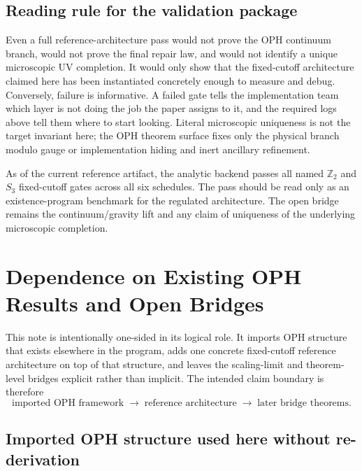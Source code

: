 \documentclass[11pt]{article}
\begin{document}
\subsection{Reading rule for the validation package}

Even a full reference-architecture pass would not prove the OPH continuum branch, would
not prove the final repair law, and would not identify a unique microscopic UV completion. It would only
show that the fixed-cutoff architecture claimed here has been instantiated concretely
enough to measure and debug. Conversely, failure is informative. A failed gate tells the
implementation team which layer is not doing the job the paper assigns to it, and the required
logs above tell them where to start looking. Literal microscopic uniqueness is not the target
invariant here; the OPH theorem surface fixes only the physical branch modulo gauge or
implementation hiding and inert ancillary refinement.

As of the current reference artifact, the analytic backend passes all named $\mathbb Z_2$ and $S_3$
fixed-cutoff gates across all six schedules. The pass should be read only as an existence-program
benchmark for the regulated architecture. The open bridge remains the continuum/gravity lift and
any claim of uniqueness of the underlying microscopic completion.

\section{Dependence on Existing OPH Results and Open Bridges}

This note is intentionally one-sided in its logical role. It imports OPH structure that
exists elsewhere in the program, adds one concrete fixed-cutoff reference architecture on top of
that structure, and leaves the scaling-limit and theorem-level bridges explicit rather than
implicit. The intended claim boundary is therefore
\begin{equation}
\text{imported OPH framework}
\;\longrightarrow\;
\text{reference architecture}
\;\longrightarrow\;
\text{later bridge theorems}.
\end{equation}

\subsection{Imported OPH structure used here without re-derivation}
\end{document}
